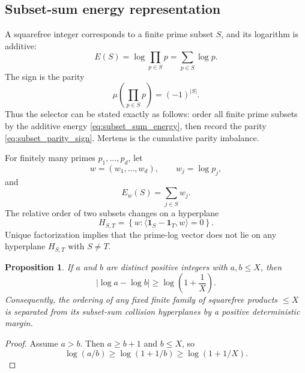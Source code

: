 \documentclass[11pt]{amsart}
\numberwithin{equation}{section}
\theoremstyle{plain}
\newtheorem{proposition}[theorem]{Proposition}
\theoremstyle{definition}
\theoremstyle{remark}
\newcommand{\Mob}{\mu}
\begin{document}
\subsection{Subset-sum energy representation}
\label{subsec:subset_sum_energy}

A squarefree integer corresponds to a finite prime subset $S$, and its logarithm is additive:
\begin{equation}
E(S)
=
\log\prod_{p\in S}p
=
\sum_{p\in S}\log p.
\label{eq:subset_sum_energy}
\end{equation}
The sign is the parity
\begin{equation}
\Mob\!\left(\prod_{p\in S}p\right)
=
(-1)^{|S|}.
\label{eq:subset_parity_sign}
\end{equation}
Thus the selector can be stated exactly as follows: order all finite prime subsets by the additive energy \eqref{eq:subset_sum_energy}, then record the parity \eqref{eq:subset_parity_sign}.  Mertens is the cumulative parity imbalance.

For finitely many primes $p_1,\ldots,p_d$, let
\begin{equation}
w=(w_1,\ldots,w_d),
\qquad
w_j=\log p_j,
\label{eq:prime_weight_vector}
\end{equation}
and
\begin{equation}
E_w(S)=\sum_{j\in S}w_j.
\label{eq:weighted_subset_energy}
\end{equation}
The relative order of two subsets changes on a hyperplane
\begin{equation}
H_{S,T}
=
\left\{w:\langle \mathbf{1}_S-\mathbf{1}_T,w\rangle=0\right\}.
\label{eq:subset_order_hyperplane}
\end{equation}
Unique factorization implies that the prime-log vector does not lie on any hyperplane $H_{S,T}$ with $S\ne T$.

\begin{proposition}
\label{prop:subset_gap}
If $a$ and $b$ are distinct positive integers with $a,b\le X$, then
\begin{equation}
|\log a-\log b|
\ge
\log\!\left(1+\frac{1}{X}\right).
\label{eq:log_integer_gap}
\end{equation}
Consequently, the ordering of any fixed finite family of squarefree products $\le X$ is separated from its subset-sum collision hyperplanes by a positive deterministic margin.
\end{proposition}

\begin{proof}
Assume $a>b$.  Then $a\ge b+1$ and $b\le X$, so
\begin{equation}
\log(a/b)
\ge
\log(1+1/b)
\ge
\log(1+1/X).
\label{eq:log_gap_proof}
\end{equation}
\end{proof}
\end{document}
